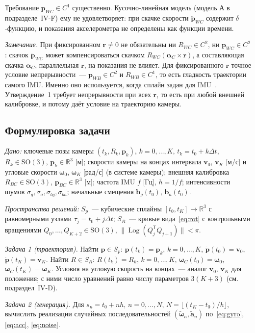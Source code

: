 \documentclass{misisarticle}
\newcommand{\Log}{\operatorname{Log}}
\newcommand{\R}{\mathbb{R}}
\newcommand{\SO}{\mathrm{SO}(3)}
\newcommand{\T}{^{\mathsf{T}}}
\newcommand{\vb}[1]{\mathbf{#1}}
\begin{document}
Требование $\vb p_{WC}\in C^1$ существенно. Кусочно-линейная модель (модель А в подразделе~IV-F) ему не удовлетворяет: при скачке скорости $\ddot{\vb p}_{WC}$ содержит $\delta$-функцию, и показания акселерометра не определены как функции времени.

\textit{Замечание.} При фиксированном $\vb r\neq0$ не обязательны ни $R_{WC}\in C^2$, ни $\vb p_{WC}\in C^2$: скачок $\ddot{\vb p}_{WC}$ может компенсироваться скачком $R_{WC}(\boldsymbol\alpha_C\times\vb r)$, а составляющая скачка $\boldsymbol\alpha_C$, параллельная $\vb r$, на показания не влияет. Для фиксированного $\vb r$ точное условие непрерывности~--- $\vb p_{WB}\in C^2$ и $R_{WB}\in C^1$, то есть гладкость траектории самого IMU. Именно оно используется, когда сплайн задан для IMU~\cite{openvins}. Утверждение~1 требует непрерывности при всех $\vb r$, то есть при любой внешней калибровке, и потому даёт условие на траекторию камеры.

\subsection{Формулировка задачи}

\textit{Дано:} ключевые позы камеры $(t_k,R_k,\vb p_k)$, $k=0,\dots,K$, $t_k=t_0+k\Delta t$, $R_k\in\SO$, $\vb p_k\in\R^3$ [м]; скорости камеры на концах интервала $\vb v_0$, $\vb v_K$ [м/с] и угловые скорости $\boldsymbol\omega_0$, $\boldsymbol\omega_K$ [рад/с] (в системе камеры); внешняя калибровка $R_{BC}\in\SO$, $\vb p_{BC}\in\R^3$ [м]; частота IMU $f$ [Гц], $h=1/f$; интенсивности шумов $\sigma_g,\sigma_a,\sigma_{bg},\sigma_{ba}$; начальные смещения $\vb b_g(t_0)$, $\vb b_a(t_0)$.

\textit{Пространства решений:} $S_p$~--- кубические сплайны $[t_0,t_K]\to\R^3$ с равномерными узлами $\tau_j=t_0+j\Delta t$; $S_R$~--- кривые вида~\eqref{eq:rot} с контрольными вращениями $Q_0,\dots,Q_{K+2}\in\SO$, $\|\Log(Q_j\T Q_{j+1})\|<\pi$.

\textit{Задача 1 (траектория).} Найти $\vb p\in S_p$: $\vb p(t_k)=\vb p_k$, $k=0,\dots,K$, $\dot{\vb p}(t_0)=\vb v_0$, $\dot{\vb p}(t_K)=\vb v_K$. Найти $R\in S_R$: $R(t_k)=R_k$, $k=0,\dots,K$, $\boldsymbol\omega_C(t_0)=\boldsymbol\omega_0$, $\boldsymbol\omega_C(t_K)=\boldsymbol\omega_K$. Условия на угловую скорость на концах~--- аналог $\vb v_0$, $\vb v_K$ для положения; с ними число уравнений равно числу параметров $3(K+3)$ (см. подраздел~IV-D).

\textit{Задача 2 (генерация).} Для $s_n=t_0+nh$, $n=0,\dots,N$, $N=\lfloor(t_K-t_0)/h\rfloor$, вычислить реализации случайных последовательностей $(\tilde{\boldsymbol\omega}_n,\tilde{\vb a}_n)$ по~\eqref{eq:gyro}, \eqref{eq:acc}, \eqref{eq:noise}.
\end{document}
